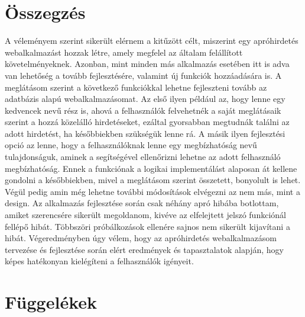 \documentclass[]{thesis-ekf}
\theoremstyle{definition}
\theoremstyle{remark}
\begin{document}
	\chapter*{Összegzés}
		A véleményem szerint sikerült elérnem a kitűzött célt, miszerint egy apróhirdetés webalkalmazást hozzak létre, amely megfelel az általam felállított követelményeknek. Azonban, mint minden más alkalmazás esetében itt is adva van lehetőség a tovább fejlesztésére, valamint új funkciók hozzáadására is. A meglátásom szerint a következő funkciókkal lehetne fejleszteni tovább az adatbázis alapú webalkalmazásomat. Az első ilyen például az, hogy lenne egy kedvencek nevű rész is, ahová a felhasználók felvehetnék a saját meglátásaik szerint a hozzá közelálló hirdetéseket, ezáltal gyorsabban megtudnák találni az adott hirdetést, ha későbbiekben szükségük lenne rá. A másik ilyen fejlesztési opció az lenne, hogy a felhasználóknak lenne egy megbízhatóság nevű tulajdonságuk, aminek a segítségével ellenőrizni lehetne az adott felhasználó megbízhatóság. Ennek a funkciónak a logikai implementálást alaposan át kellene gondolni a későbbiekben, mivel a meglátásom szerint összetett, bonyolult is lehet. Végül pedig amin még lehetne további módosítások elvégezni az nem más, mint a design. Az alkalmazás fejlesztése során csak néhány apró hibába botlottam, amiket szerencsére sikerült megoldanom, kivéve az elfelejtett jelszó funkciónál fellépő hibát. Többszöri próbálkozások ellenére sajnos nem sikerült kijavítani a hibát. Végeredményben úgy vélem, hogy az apróhirdetés webalkalmazásom tervezése és fejlesztése során elért eredmények és tapasztalatok alapján, hogy képes hatékonyan kielégíteni a felhasználók igényeit.
	\chapter*{Függelékek}\label{ch-fugg}
\end{document}
